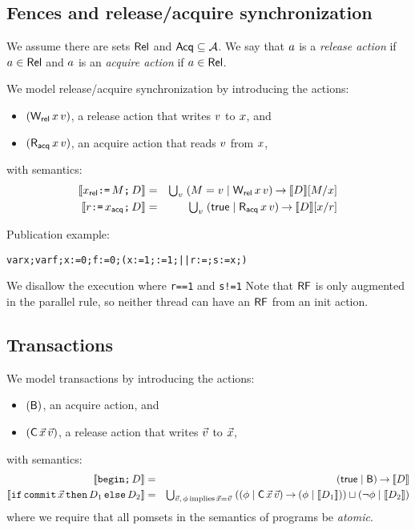 \subsection{Fences and release/acquire synchronization}

We assume there are sets $\mathsf{Rel}$ and $\mathsf{Acq} \subseteq\mathcal{A}$.  We say that
$a$ is a \emph{release action} if $a\in\mathsf{Rel}$ and $a$ is an
\emph{acquire action} if $a\in\mathsf{Rel}$.  

We model release/acquire synchronization by introducing the actions:
\begin{itemize}
\item $(\DWRel{\aLoc}{\aVal})$, a release action that writes $v$ to $x$, and
\item $(\DRAcq{\aLoc}{\aVal})$, an acquire action that reads $v$ from $x$,
\end{itemize}
with semantics:
\begin{eqnarray*}
  \sem{\REL\aLoc\GETS\aExp\SEMI \bCmd}
  & = & \textstyle\bigcup_\aVal\; (\aExp=\aVal \mid \DWRel\aLoc\aVal) \prefix \sem{\bCmd}[\aExp/\aLoc]
  \\
  \sem{\aReg\GETS\ACQ\aLoc\SEMI \bCmd}
  & = & \textstyle\bigcup_\aVal\; (\TRUE \mid \DRAcq\aLoc\aVal) \prefix \sem{\bCmd}[\aLoc/\aReg] 
\end{eqnarray*}

Publication example:
\begin{alltt}
    var x; var f; x:=0; f:=0; (x:=1; :=1;  ||  r:=; s:=x;)
\end{alltt}
We disallow the execution where \texttt{r==1} and \texttt{s!=1}
Note that $\mathsf{RF}$ is only augmented in the parallel rule, so neither thread can have an $\mathsf{RF}$ from an init action.

\subsection{Transactions}

We model transactions by introducing the actions:
\begin{itemize}
\item $(\mathsf{B})$, an acquire action, and
\item $(\DC{\vec\aLoc}{\vec\aVal})$, a release action that writes $\vec{v}$ to $\vec{x}$,
\end{itemize}
with semantics:
\begin{eqnarray*}
  \sem{\BEGIN\SEMI \bCmd}
  & = & %
  (\TRUE \mid \DB) \prefix \sem{\bCmd}
  \\
  \sem{\IF\COMMIT\vec\aLoc\THEN \bCmd_1 \ELSE \bCmd_2}
  & = & \textstyle\bigcup_{\vec\aVal,\,\aForm\,\text{implies}\,\vec\aLoc=\vec\aVal}\;
        ((\aForm \mid \DC{\vec\aLoc}{\vec\aVal}) \prefix (\aForm \mid \sem{\bCmd_1}))
        \sqcup  (\lnot\aForm \mid \sem{\bCmd_2})
\end{eqnarray*}
where we require that all pomsets in the semantics of programs be
\emph{atomic}.

